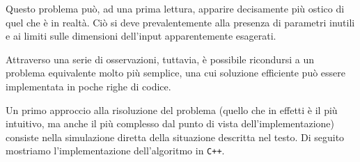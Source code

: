 

    Questo problema può, ad una prima lettura, apparire decisamente più ostico di quel che è in realtà. Ciò si deve prevalentemente alla presenza di parametri inutili e ai limiti sulle dimensioni dell'input apparentemente esagerati.
    
    Attraverso una serie di osservazioni, tuttavia, è possibile ricondursi a un problema equivalente molto più semplice, una cui soluzione efficiente può essere implementata in poche righe di codice. \\
    
    \NKLenta
    
    Un primo approccio alla risoluzione del problema (quello che in effetti è il più intuitivo, ma anche il più complesso dal punto di vista dell'implementazione) consiste nella simulazione diretta della situazione descritta nel testo.
    Di seguito mostriamo l'implementazione dell'algoritmo in \texttt{C++}.
    
    \colorbox{white}{}
    
    \begin{comment}
        \begin{lstlisting}[language=C++]
const int MAXN = 1000001;

// Definiscono lo stato delle lampadine e degli interruttori
bool luci[MAXN], interruttori[MAXN];

int spegni(int N, int M, int K) {
    // corrente contiene l'indice del prossimo interruttore premuto
    int corrente = M, ans = 0;

    for (int i = 1; i <= N; i++) {
        // Preme l'interruttore corrente
        interruttori[corrente] = true;
        // Accende tutte le lampadine multiple di corrente
        for (int j = corrente; j <= N; j += corrente)
            luci[j] ^= true;
        // Trova il K-esimo interruttore non premuto
        for (int j = 0; i < N && j < K; j++) { 
            corrente = (corrente % N) + 1;
            while (interruttori[corrente])
                corrente = (corrente % N) + 1;
        }
    }

    // Conta le lampadine accese
    for (int i = 1; i <= N; i++)
        ans += !luci[i];

    return ans;
}
        \end{lstlisting}
    \end{comment}
    

